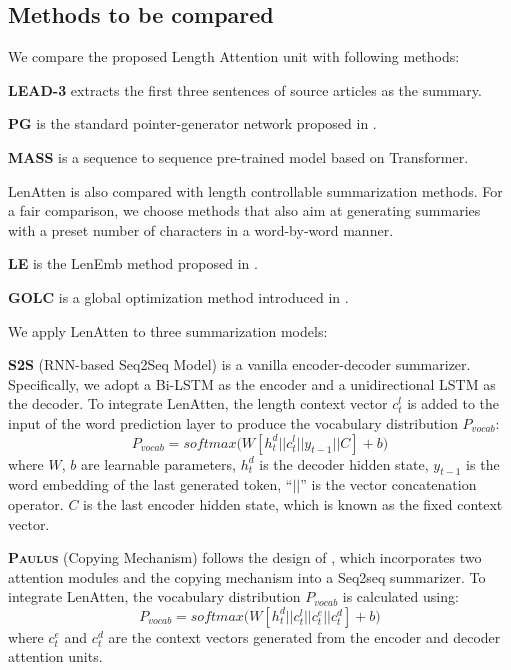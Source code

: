 \documentclass[11pt,a4paper]{article}
\begin{document}
\subsection{Methods to be compared}
\label{sec:methods_tb_compared}

We compare the proposed Length Attention unit with following methods:

\textsc{\textbf{LEAD-3}} extracts the first three sentences of source articles as the summary.

\textsc{\textbf{PG}} is the standard pointer-generator network proposed in \citet{see-etal-2017-get}.

\textsc{\textbf{MASS}} \citep{DBLP:conf/icml/SongTQLL19} is a sequence to sequence pre-trained model based on Transformer.

LenAtten is also compared with length controllable summarization methods. For a fair comparison, we choose methods that also aim at generating summaries with a preset number of characters in a word-by-word manner.

\textsc{\textbf{LE}} is the LenEmb method proposed in \citet{kikuchi-etal-2016-controlling}.

\textsc{\textbf{GOLC}} is a global optimization method introduced in \citet{makino-etal-2019-global}.

We apply LenAtten to three summarization models: 

\textsc{\textbf{S2S}} (RNN-based Seq2Seq Model) is a vanilla encoder-decoder summarizer. Specifically, we adopt a Bi-LSTM as the encoder and a unidirectional LSTM as the decoder. To integrate LenAtten, the length context vector $c^l_t$ is added to the input of the word prediction layer to produce the vocabulary distribution $P_{vocab}$:
\begin{equation}
    P_{vocab} = softmax\Big(W[h^d_t || c^l_t || y_{t-1}|| C] + b\Big)
\end{equation} where $W$, $b$ are learnable parameters, $h^d_t$ is the decoder hidden state, $y_{t-1}$ is the word embedding of the last generated token, ``$||$'' is the vector concatenation operator. $C$ is the last encoder hidden state, which is known as the fixed context vector.

\textsc{\textbf{Paulus}} (Copying Mechanism) follows the design of \citet {DBLP:conf/iclr/PaulusXS18}, which incorporates two attention modules and the copying mechanism into a Seq2seq summarizer. To integrate LenAtten, the vocabulary distribution $P_{vocab}$ is calculated using:
\begin{equation}
    P_{vocab} = softmax\Big(W[h^d_t || c^l_t || c^e_t || c^d_t] + b\Big)
\end{equation} where $c^e_t$ and $c^d_t$ are the context vectors generated from the encoder and decoder attention units.
\end{document}
